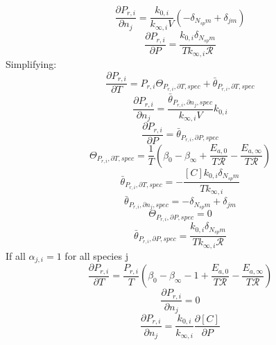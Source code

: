 \documentclass[a4paper,10pt]{article}
\newcommand{\ns}{N_{sp}}
\newcommand{\Ru}{\mathcal{R}}
\begin{document}
\begin{dmath} \frac{\partial P_{r, i} }{\partial {n_j} } = \frac{k_{0, i}}{k_{\infty, i} V} \left(- \delta_{\ns m} + \delta_{j m}\right)\end{dmath} 
\begin{dmath} \frac{\partial P_{r, i} }{\partial P } = \frac{k_{0, i} \delta_{\ns m}}{T k_{\infty, i} \Ru}\end{dmath} 
Simplifying:
\begin{dmath} \frac{\partial P_{r, i} }{\partial T } = P_{r, i} \Theta_{P_{r,i}, \partial T, spec} + \bar{\theta}_{P_{r, i}, \partial T, spec}\end{dmath} 
\begin{dmath} \frac{\partial P_{r, i} }{\partial {n_j} } = \frac{\bar{\theta}_{P_{r, i}, \partial n_j, spec}}{k_{\infty, i} V} k_{0, i}\end{dmath} 
\begin{dmath} \frac{\partial P_{r, i} }{\partial P } = \bar{\theta}_{P_{r, i}, \partial P, spec}\end{dmath} 
\begin{dmath} \Theta_{P_{r,i}, \partial T, spec} = \frac{1}{T} \left(\beta_{0} - \beta_{\infty} + \frac{E_{a, 0}}{T \Ru} - \frac{E_{a, \infty}}{T \Ru}\right)\end{dmath} 
\begin{dmath} \bar{\theta}_{P_{r, i}, \partial T, spec} = - \frac{[C] k_{0, i} \delta_{\ns m}}{T k_{\infty, i}}\end{dmath} 
\begin{dmath} \bar{\theta}_{P_{r, i}, \partial n_j, spec} = - \delta_{\ns m} + \delta_{j m}\end{dmath} 
\begin{dmath} \Theta_{P_{r,i}, \partial P, spec} = 0\end{dmath} 
\begin{dmath} \bar{\theta}_{P_{r, i}, \partial P, spec} = \frac{k_{0, i} \delta_{\ns m}}{T k_{\infty, i} \Ru}\end{dmath} 
If all $\alpha_{j, i} = 1$ for all species j
\begin{dmath} \frac{\partial P_{r, i} }{\partial T } = \frac{P_{r, i}}{T} \left(\beta_{0} - \beta_{\infty} - 1 + \frac{E_{a, 0}}{T \Ru} - \frac{E_{a, \infty}}{T \Ru}\right)\end{dmath} 
\begin{dmath} \frac{\partial P_{r, i} }{\partial {n_j} } = 0\end{dmath} 
\begin{dmath} \frac{\partial P_{r, i} }{\partial {n_j} } = \frac{k_{0, i}}{k_{\infty, i}} \frac{\partial [C] }{\partial P }\end{dmath} 
\end{document}
